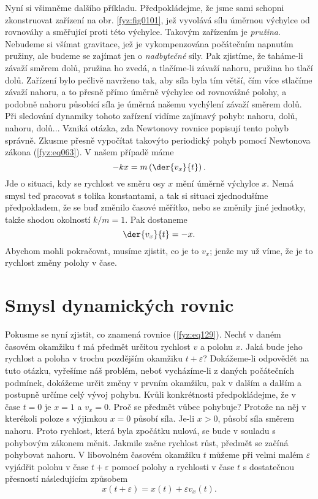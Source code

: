     Nyní si všimněme dalšího příkladu. Předpokládejme, že jsme sami schopni zkonstruovat zařízení na
    obr. \ref{fyz:fig0101}, jež vyvolává sílu úměrnou výchylce od rovnováhy a směřující proti této 
    výchylce. Takovým zařízením je \emph{pružina}. Nebudeme si všímat gravitace, jež je 
    vykompenzována počátečním napnutím pružiny, ale budeme se zajímat jen o \emph{nadbytečné} síly. 
    Pak zjistíme, že taháme-li závaží směrem dolů, pružina ho zvedá, a tlačíme-li závaží nahoru, 
    pružina ho tlačí dolů. Zařízení bylo pečlivě navrženo tak, aby síla byla tím větší, čím více 
    stlačíme závaží nahoru, a to přesně přímo úměrně výchylce od rovnovážné polohy, a podobně 
    nahoru působící síla je úměrná našemu vychýlení závaží směrem dolů. Při sledování dynamiky 
    tohoto zařízení vidíme zajímavý pohyb: nahoru, dolů, nahoru, dolů... Vzniká otázka, zda 
    Newtonovy rovnice popisují tento pohyb správně. Zkusme přesně vypočítat takovýto periodický 
    pohyb pomocí Newtonova zákona (\ref{fyz:eq063}). V našem případě máme
    \begin{equation}\label{fyz:eq128}
      -kx = m\left(\der{v_x}{t}\right).
    \end{equation}
    Jde o situaci, kdy se rychlost ve směru osy \(x\) mění úměrně výchylce \(x\). Nemá smysl teď 
    pracovat s tolika konstantami, a tak si situaci zjednodušíme předpokladem, že se buď změnilo 
    časové měřítko, nebo se změnily jiné jednotky, takže shodou okolností \(k/m = 1\). Pak dostaneme
    \begin{equation}\label{fyz:eq129}
      \der{v_x}{t} = -x.
    \end{equation}
    Abychom mohli pokračovat, musíme zjistit, co je to \(v_x\); jenže my už víme, že je to rychlost 
    změny polohy v čase.
    
  \section{Smysl dynamických rovnic}\label{fyz:IchapIXsecV}
    Pokusme se nyní zjistit, co znamená rovnice (\ref{fyz:eq129}). Nechť v daném časovém okamžiku 
    \(t\) má předmět určitou rychlost \(v\) a polohu \(x\). Jaká bude jeho rychlost a poloha v 
    trochu pozdějším okamžiku \(t+\varepsilon\)? Dokážeme-li odpovědět na tuto otázku, vyřešíme náš 
    problém, neboť vycházíme-li z daných počátečních podmínek, dokážeme určit změny v prvním 
    okamžiku, pak v dalším a dalším a postupně určíme celý vývoj pohybu. Kvůli konkrétnosti 
    předpokládejme, že v čase \(t = 0\) je \(x= 1\) a \(v_x = 0\). Proč se předmět vůbec pohybuje? 
    Protože na něj v kterékoli poloze s výjimkou \(x=0\) působí síla. Je-li \(x > 0\), působí síla 
    směrem nahoru. Proto rychlost, která byla zpočátku nulová, se bude v souladu s pohybovým 
    zákonem měnit. Jakmile začne rychlost růst, předmět se začíná pohybovat nahoru. V libovolném 
    časovém okamžiku \(t\) můžeme při velmi malém \(\varepsilon\) vyjádřit polohu v čase \(t + 
    \varepsilon\) pomocí polohy a rychlosti v čase \(t\) s dostatečnou přesností následujícím 
    způsobem
    \begin{equation}\label{fyz:eq130}
      x(t+\varepsilon) = x(t) + \varepsilon v_x(t).
    \end{equation}
    
